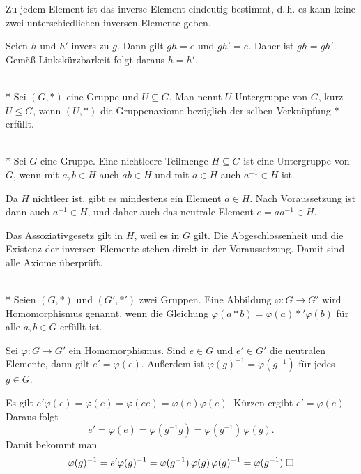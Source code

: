 \begin{Satz} Zu jedem Element ist das inverse Element eindeutig
bestimmt, d.\,h. es kann keine zwei unterschiedlichen inversen
Elemente geben.
\end{Satz}
 Seien $h$ und $h'$ invers zu $g$. Dann gilt
$gh=e$ und $gh'=e$. Daher ist $gh=gh'$. Gemäß Linkskürzbarkeit
folgt daraus $h=h'$.\;\qedsymbol

\begin{Definition}[Untergruppe]\mbox{}\\*
Sei $(G,*)$ eine Gruppe und $U\subseteq G$.
Man nennt $U$ Untergruppe von $G$, kurz $U\le G$, wenn
$(U,*)$ die Gruppenaxiome bezüglich der selben Verknüpfung $*$
erfüllt.
\end{Definition}

\begin{Satz}[Untergruppenkriterium]\mbox{}\\*
Sei $G$ eine Gruppe. Eine nichtleere Teilmenge $H\subseteq G$ ist eine
Untergruppe von $G$, wenn mit $a,b\in H$ auch $ab\in H$ und
mit $a\in H$ auch $a^{-1}\in H$ ist.
\end{Satz}
Da $H$ nichtleer ist, gibt es mindestens ein
Element $a\in H$. Nach Voraussetzung ist dann auch $a^{-1}\in H$,
und daher auch das neutrale Element $e=aa^{-1}\in H$.

Das Assoziativgesetz gilt in $H$, weil es in $G$ gilt.
Die Abgeschlossenheit und die Existenz der inversen Elemente
stehen direkt in der Voraussetzung. Damit sind alle Axiome
überprüft.\;\qedsymbol

\begin{Definition}\mbox{}\\*
Seien $(G,*)$ und $(G',*')$ zwei Gruppen. Eine Abbildung
$\varphi\colon G\to G'$ wird Homomorphismus genannt, wenn die
Gleichung
$\varphi(a*b) = \varphi(a)*'\varphi(b)$
für alle $a,b\in G$ erfüllt ist.
\end{Definition}

\begin{Satz} Sei $\varphi\colon G\to G'$ ein Homomorphismus.
Sind $e\in G$ und $e'\in G'$ die neutralen Elemente, dann gilt
$e'=\varphi(e)$. Außerdem ist $\varphi(g)^{-1}=\varphi(g^{-1})$
für jedes $g\in G$.
\end{Satz}
 Es gilt
$e'\varphi(e) = \varphi(e) = \varphi(ee) = \varphi(e)\varphi(e)$.
Kürzen ergibt $e'=\varphi(e)$. Daraus folgt
\[e' = \varphi(e) = \varphi(g^{-1}g) = \varphi(g^{-1})\,\varphi(g).\]
Damit bekommt man
\[\varphi(g)^{-1} = e'\varphi(g)^{-1}
= \varphi(g^{-1})\,\varphi(g)\,\varphi(g)^{-1}
= \varphi(g^{-1})\;\Box\]

